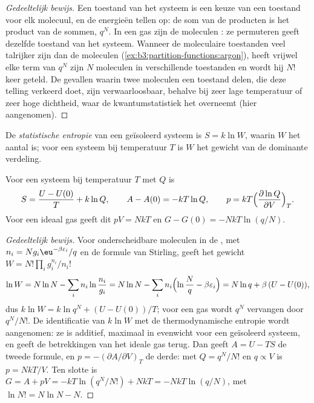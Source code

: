 \begin{proof}[Gedeeltelijk bewijs]
Een toestand van het systeem is een keuze van een toestand voor elk
molecuul, en de energieën tellen op: de som van de producten is het
product van de sommen, $q^N$. In een gas zijn de moleculen
: ze permuteren geeft dezelfde toestand van het
systeem. Wanneer de moleculaire toestanden veel talrijker zijn dan de
moleculen
(\cref{ex:b3:partition-functions:argon}), heeft vrijwel elke term van $q^N$
zijn $N$ moleculen in verschillende toestanden en wordt hij $N!$ keer
geteld. De gevallen waarin twee moleculen een toestand delen, die deze
telling verkeerd doet, zijn verwaarloosbaar, behalve bij zeer lage
temperatuur of zeer hoge dichtheid, waar de kwantumstatistiek het
overneemt (hier aangenomen).
\end{proof}

\begin{definition}\label{def:b3:partition-functions:statistical-entropy}
De \emph{statistische entropie} van een
geïsoleerd systeem is
$S = k\ln W$, waarin $W$ het aantal  is; voor een systeem
bij temperatuur $T$ is $W$ het gewicht van de dominante verdeling.
\end{definition}

\begin{theorem}\label{thm:b3:partition-functions:entropy}
Voor een systeem bij temperatuur $T$ met  $Q$ is
\[
  S = \frac{U - U(0)}{T} + k\ln Q, \qquad A - A(0) = -kT\ln Q, \qquad
  p = kT\Bigl(\frac{\partial\ln Q}{\partial V}\Bigr)_T .
\]
Voor een ideaal gas geeft dit $pV = NkT$ en $G - G(0) = -NkT\ln(q/N)$.
\end{theorem}

\begin{proof}[Gedeeltelijk bewijs]
Voor onderscheidbare moleculen in de , met $n_i = Ng_i\eu^{-\beta\varepsilon_i}/q$
en de formule van Stirling, geeft het gewicht $W = N!\prod_ig_i^{n_i}/n_i!$
\[
  \ln W = N\ln N - \sum_in_i\ln\frac{n_i}{g_i} = N\ln N - \sum_in_i\Bigl(\ln\frac Nq - \beta\varepsilon_i\Bigr)
        = N\ln q + \beta\,(U - U(0)),
\]
dus $k\ln W = k\ln q^N + (U - U(0))/T$; voor een gas wordt $q^N$
vervangen door $q^N/N!$. De identificatie van $k\ln W$ met de
thermodynamische entropie wordt aangenomen: ze is additief, maximaal in
evenwicht voor een geïsoleerd systeem, en geeft de betrekkingen van het
ideale gas terug. Dan geeft $A = U - TS$ de tweede formule, en $p =
-(\partial A/\partial V)_T$ de derde: met $Q = q^N/N!$ en $q \propto V$ is $p = NkT/V$. Ten slotte is
$G = A + pV = -kT\ln(q^N/N!) + NkT = -NkT\ln(q/N)$, met $\ln N! = N\ln N - N$.
\end{proof}

